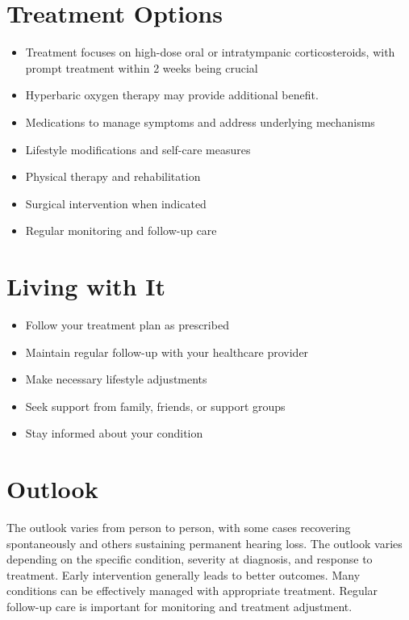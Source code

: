 \section{Treatment Options}
\begin{itemize}[noitemsep]
  \item Treatment focuses on high-dose oral or intratympanic corticosteroids, with prompt treatment within 2 weeks being crucial
  \item Hyperbaric oxygen therapy may provide additional benefit.
  \item Medications to manage symptoms and address underlying mechanisms
  \item Lifestyle modifications and self-care measures
  \item Physical therapy and rehabilitation
  \item Surgical intervention when indicated
  \item Regular monitoring and follow-up care
\end{itemize}
\section{Living with It}
\begin{itemize}[noitemsep]
  \item Follow your treatment plan as prescribed
  \item Maintain regular follow-up with your healthcare provider
  \item Make necessary lifestyle adjustments
  \item Seek support from family, friends, or support groups
  \item Stay informed about your condition
\end{itemize}
\section{Outlook}
The outlook varies from person to person, with some cases recovering spontaneously and others sustaining permanent hearing loss. The outlook varies depending on the specific condition, severity at diagnosis, and response to treatment. Early intervention generally leads to better outcomes. Many conditions can be effectively managed with appropriate treatment. Regular follow-up care is important for monitoring and treatment adjustment.
